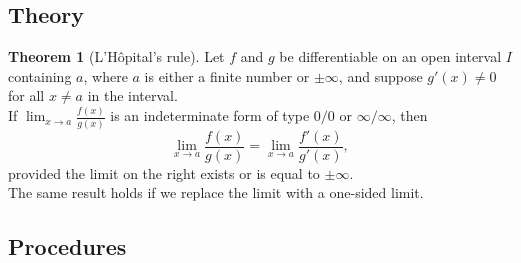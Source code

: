 \documentclass[11pt]{article}
\theoremstyle{definition}
\newtheorem*{comment}{Comment}
\theoremstyle{named}
\newtheorem*{namedtheorem}{Theorem}
\numberwithin{myalgctr}{section}
\begin{document}
\subsection*{Theory}
\begin{namedtheorem}[L'H\^opital's rule] Let $f$ and $g$ be differentiable on an open interval $I$ containing $a$, where $a$ is either a finite number or $\pm\infty$, and suppose $g'(x)\ne 0$ for all $x\ne a$ in the interval.
  \vspace{.1in}
  \\
  If $\displaystyle\lim_{x\to a}\frac{f(x)}{g(x)}$ is an indeterminate form of type $0/0$ or $\infty/\infty$, then
  \[
  \lim_{x\to a}\frac{f(x)}{g(x)}=\lim_{x\to a}\frac{f'(x)}{g'(x)},
  \]
  provided the limit on the right exists or is equal to $\pm\infty$. \\
  The same result holds if we replace the limit with a one-sided limit.

\end{namedtheorem}
\begin{comment}
Students tend to fall madly in love with l'H\^opital's rule after seeing it for the first time. Some comments to temper your passion:
\begin{enumerate}
  \item Make sure the necessary conditions hold: (a) $f,g$ differentiable on an interval about $a$, $g(x)\ne 0$ on for $x\ne a$, and the limit expression is indeterminate of type $0/0$ or $\infty/\infty$.
  \item As magic as the rule appears, there are many examples where either the application of this rule does not help, and/or it is easier to use a different technique. Consider the following limits, for example:
  \[
  \lim_{x\to\infty}\frac{e^x+e^{-x}}{e^x-e^{-x}}, \hspace{10pt} \lim_{x\rightarrow \infty}\frac{x^4-x^2+5x+7}{2x^4+x^3+x^2+x+1}
  \]
\end{enumerate}
\end{comment}


\subsection*{Procedures}

\end{document}
